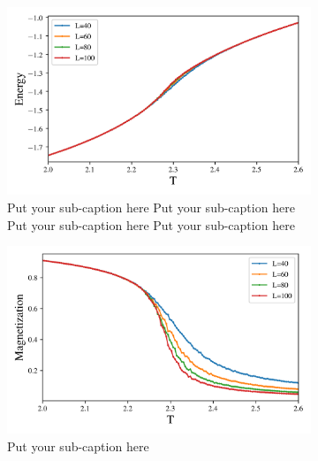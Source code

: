\begin{figure}[ht]
  \begin{subfigure}[t]{.5\textwidth} %
    \centering
    \includegraphics[width=\linewidth]{../figures/phase_E.png}
    \caption{Put your sub-caption here
    Put your sub-caption here
    Put your sub-caption here
    Put your sub-caption here}
    \label{fig:sub-first}
  \end{subfigure}
  \hfill
  \begin{subfigure}[t]{.5\textwidth}
    \centering
    \includegraphics[width=\linewidth]{../figures/phase_Mabs.png}
    \caption{Put your sub-caption here}
    \label{fig:sub-second}
  \end{subfigure}
  \hfill
  \newline
  \begin{subfigure}[t]{.5\textwidth}
    \centering

\end{subfigure}
\end{figure}
